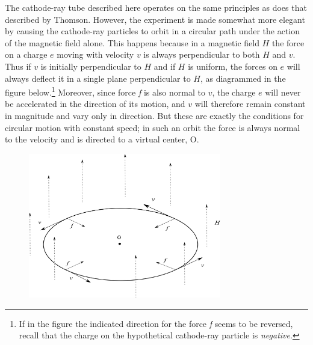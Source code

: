 The cathode-ray tube de\-scribed here operates on the same principles as
does that de\-scribed by Thomson. However, the experiment is made somewhat
more elegant by causing the cathode-ray particles to orbit in a circular
path under the action of the magnetic field alone. This happens because
in a magnetic field $H$ the force on a charge $e$ moving with
velocity $v$ is always per\-pen\-dic\-u\-lar to both $H$ and $v$.
Thus if $v$ is initially per\-pen\-dic\-u\-lar to $H$ and if $H$
is uniform, the forces on $e$ will always deflect it in a single
plane per\-pen\-dic\-u\-lar to $H$, as diagrammed in the figure
below.\footnote{If in the figure the indicated direction for the force
  \emph{f} seems to be reversed, recall that the charge on the
  hypothetical cathode-ray particle is \emph{negative}.} Moreover, since
force \emph{f} is also normal to $v$, the charge $e$ will
never be accelerated in the direction of its motion, and $v$ will
therefore remain constant in magnitude and vary only in direction. But
these are exactly the conditions for circular motion with constant
speed; in such an orbit the force is always normal to the velocity and
is directed to a virtual center, O.

\begin{figure}[h]
  \begin{center}
    \includegraphics[width=0.75\textwidth]{images/02_thomson/image099.png}
  \end{center}
\end{figure}

